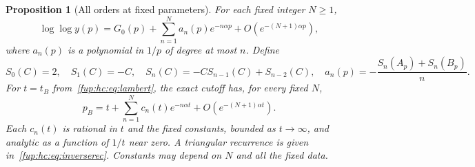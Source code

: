 \documentclass[11pt,letterpaper]{article}
\newtheorem{proposition}[theorem]{Proposition}
\theoremstyle{definition}\newtheorem{definition}[theorem]{Definition}
\theoremstyle{remark}\newtheorem{remark}[theorem]{Remark}
\begin{document}
\begin{proposition}[All orders at fixed parameters]\label{fup:hc:prop:allorders}
For each fixed integer $N\ge1$,
\begin{equation}\label{fup:hc:eq:allheight}
 \log\log y(p)=G_0(p)+\sum_{n=1}^N a_n(p)e^{-n\alpha p}
                         +O(e^{-(N+1)\alpha p}),
\end{equation}
where $a_n(p)$ is a polynomial in $1/p$ of degree at most $n$. Define
\begin{equation}\label{fup:hc:eq:coefficientrec}
 S_0(C)=2,\quad S_1(C)=-C,\quad
 S_n(C)=-CS_{n-1}(C)+S_{n-2}(C),\quad
 a_n(p)=-\frac{S_n(A_p)+S_n(B_p)}n.
\end{equation}
For $t=t_B$ from~\eqref{fup:hc:eq:lambert}, the exact cutoff has, for every fixed $N$,
\begin{equation}\label{fup:hc:eq:allinverse}
 p_B=t+\sum_{n=1}^N c_n(t)e^{-n\alpha t}
                  +O(e^{-(N+1)\alpha t}).
\end{equation}
Each $c_n(t)$ is rational in $t$ and the fixed constants, bounded as $t\to\infty$, and analytic as a function of $1/t$ near zero. A triangular recurrence is given in~\eqref{fup:hc:eq:inverserec}. Constants may depend on $N$ and all the fixed data.
\end{proposition}
\end{document}
